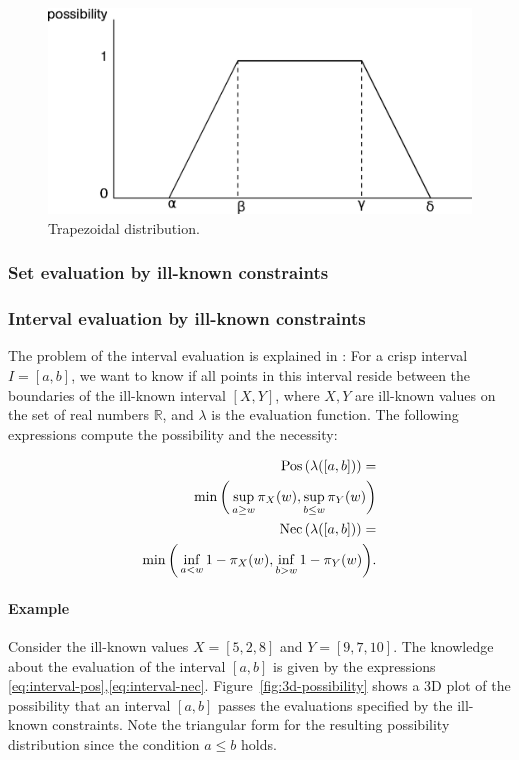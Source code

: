 \begin{figure}[h!]
  \centering
  \includegraphics[scale=0.4]{graphs/trapezoidalDistribution.eps}
  \caption{Trapezoidal distribution.}
  \label{fig:trapezoidal}
\end{figure}

\subsubsection{Set evaluation by ill-known constraints}

\subsubsection{Interval evaluation by ill-known constraints}
The problem of the interval evaluation is explained in \cite{Pon11}: For a crisp interval $I = \left[ a, b \right]$, we want to know if all points in this interval reside between the boundaries of the ill-known interval $\left[ X , Y \right]$, where $X,Y$ are ill-known values on the set of real numbers $\mathbb{R}$, and $\lambda$ is the evaluation function. The following expressions compute the possibility and the necessity: 

\begin{eqnarray}
\label{eq:interval-pos}
\operatorname{Pos}\left(\lambda([a,b])\right)=\\
\nonumber
\min\bigg(\sup_{a\geq w}\pi_{X}(w),\sup_{b\leq w}\pi_{Y}(w)\bigg)\\
\label{eq:interval-nec}
\operatorname{Nec}\left(\lambda([a,b])\right)=\\
\nonumber
\min\bigg(\inf_{a<w}1-\pi_{X}(w),\inf_{b>w}1-\pi_{Y}(w)\bigg).
\end{eqnarray}

\paragraph{Example} Consider the ill-known values $X = \left[5, 2, 8\right]$ and $Y = \left[9, 7, 10 \right]$. The knowledge about the evaluation of the interval $\left[a, b \right]$  is given by the expressions \eqref{eq:interval-pos},\eqref{eq:interval-nec}.  Figure~\ref{fig:3d-possibility} shows a 3D plot of the possibility that an interval $[a,b]$ passes the evaluations specified by the ill-known constraints. Note the triangular form for the resulting possibility distribution since the condition $a \leq b$ holds.

